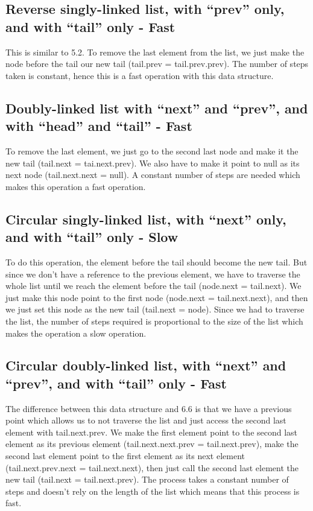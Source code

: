 \documentclass{article}
\begin{document}
\subsection{Reverse singly-linked list, with “prev” only, and with “tail” only - Fast}
This is similar to 5.2. To remove the last element from the list, we just make the node before the tail our new tail (tail.prev = tail.prev.prev). The number of steps taken is constant, hence this is a fast operation with this data structure.

\subsection{Doubly-linked list with “next” and “prev”, and with “head” and “tail” - Fast}
To remove the last element, we just go to the second last node and make it the new tail (tail.next = tai.next.prev). We also have to make it point to null as its next node (tail.next.next = null). A constant number of steps are needed which makes this operation a fast operation.

\subsection{Circular singly-linked list, with “next” only, and with “tail” only - Slow}
To do this operation, the element before the tail should become the new tail. But since we don't have a reference to the previous element, we have to traverse the whole list until we reach the element before the tail (node.next = tail.next). We just make this node point to the first node (node.next = tail.next.next), and then we just set this node as the new tail (tail.next = node). Since we had to traverse the list, the number of steps required is proportional to the size of the list which makes the operation a slow operation.

\subsection{Circular doubly-linked list, with “next” and “prev”, and with “tail” only - Fast}
The difference between this data structure and 6.6 is that we have a previous point which allows us to not traverse the list and just access the second last element with tail.next.prev. We make the first element point to the second last element as its previous element (tail.next.next.prev = tail.next.prev), make the second last element point to the first element as its next element (tail.next.prev.next = tail.next.next), then just call the second last element the new tail (tail.next = tail.next.prev). The process takes a constant number of steps and doesn't rely on the length of the list which means that this process is fast.\\
\end{document}
